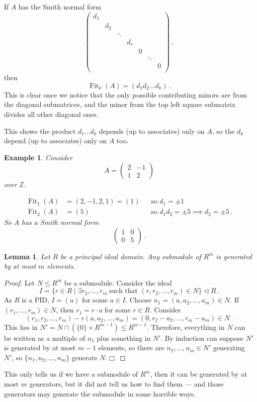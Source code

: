 \documentclass{article}
\theoremstyle{plain}\theoremheaderfont{\normalfont\itshape}\theorembodyfont{\rmfamily}\theoremseparator{.}\newtheorem*{rem}{Remark}\newtheorem*{ex}{Example}\newtheorem*{proof}{Proof}\newtheorem*{altp}{Alternative proof}\newtheorem*{nonex}{Non-Example}
\theoremstyle{plain}\theoremheaderfont{\normalfont\bfseries}\theorembodyfont{\rmfamily}\theoremseparator{.}\newtheorem{thm}{Theorem}[section]\newtheorem{lem}[thm]{Lemma}\newtheorem{prop}[thm]{Proposition}\newtheorem*{cor}{Corollary}\newtheorem{defn}[thm]{Definition}\newtheorem{clm}[thm]{Claim}\newtheorem{clminproof}{Claim}\newtheorem*{notn}{Notation}\newtheorem*{exer}{Exercise}\newtheorem*{lemnn}{Lemma}
\theoremstyle{break}\theoremheaderfont{\normalfont\itshape}\theorembodyfont{\rmfamily}\theoremseparator{.\medskip}\newtheorem*{proofskip}{Proof}\newtheorem*{exs}{Examples}\newtheorem*{rems}{Remarks}\newtheorem*{obs}{Observations}
\theoremstyle{break}\theoremheaderfont{\normalfont\bfseries}\theorembodyfont{\rmfamily}\theoremseparator{.\medskip}\newtheorem{lemskip}[thm]{Lemma}\newtheorem{defnskip}[thm]{Definition}\newtheorem{propskip}[thm]{Proposition}\newtheorem{thmskip}[thm]{Theorem}
\numberwithin{equation}{section}
\newcommand{\qed}{\hfill\ensuremath{\Box}}
\DeclareMathOperator{\Fit}{Fit}
\newcommand{\ZZ}{\mathbb{Z}}
\begin{document}
    If \(A\) has the Smith normal form
    \[\begin{pmatrix}
        d_1 \\
        ~ & d_2\\
        ~ & ~ & \ddots \\
        ~ & ~ & ~ & d_r\\
        ~ & ~ & ~ & ~ & 0\\
        ~ & ~ & ~ & ~ & ~ & \ddots\\
        ~ & ~ & ~ & ~ & ~ & ~ & 0\\
    \end{pmatrix}\,,\]
    then
    \[\Fit_k(A)=(d_1d_2\dots d_k)\,.\]
    This is clear once we notice that the only possible contributing minors are from the diagonal submatrices, and the minor from the top left square submatrix divides all other diagonal ones.

    This shows the product \(d_1\dots d_k\) depends (up to associates) only on \(A\), so the \(d_k\) depend (up to associates) only on \(A\) too.
    \begin{ex}
        Consider
        \[A=\begin{pmatrix}
            2 & -1\\
            1 & 2
        \end{pmatrix}\]
        over \(\ZZ\).

        \begin{align*}
            \Fit_1(A)&=(2,-1,2,1)=(1) &&\text{so }d_1=\pm 1\\
            \Fit_2(A)&=(5) &&\text{so }d_1d_2=\pm 5\implies d_2=\pm 5\,.
        \end{align*}
        So \(A\) has a Smith normal form
        \[\begin{pmatrix}
            1 & 0\\
            0 & 5
        \end{pmatrix}\,.\]
    \end{ex}
    \begin{lem}
        Let \(R\) be a principal ideal domain. Any submodule of \(R^m\) is generated by at most \(m\) elements.
    \end{lem}
    \begin{proof}
        Let \(N\le R^m\) be a submodule. Consider the ideal
        \[I=\{r\in R\mid \exists r_2,\dots,r_m \ \text{such that }(r,r_2,\dots,r_m)\in N\}\lhd R\,.\]
        As \(R\) is a PID, \(I=(a)\) for some \(a\in I\). Choose \(n_1=(a,a_2,\dots,a_m)\in N\). If \((r_1,\dots,r_m)\in N\), then \(r_1=r\cdot a\) for some \(r\in R\). Consider
        \[(r_1,r_2,\dots,r_m)-r(a,a_2,\dots,a_m)=(0,r_2-a_2,\dots,r_m-a_m)\in N\,.\]
        This lies in \(N'=N\cap(\{0\}\times R^{m-1})\le R^{m-1}\). Therefore, everything in \(N\) can be written as a multiple of \(n_1\) plus something in \(N'\). By induction can suppose \(N'\) is generated by at most \(m-1\) elements, so there are \(n_2,\dots,n_m\in N'\) generating \(N'\), so \(\{n_1,n_2,\dots,n_m\}\) generate \(N\).\qed
    \end{proof}
    This only tells us if we have a submodule of \(R^m\), then it can be generated by at most \(m\) generators, but it did not tell us how to find them --- and those generators may generate the submodule in some horrible ways.
\end{document}
